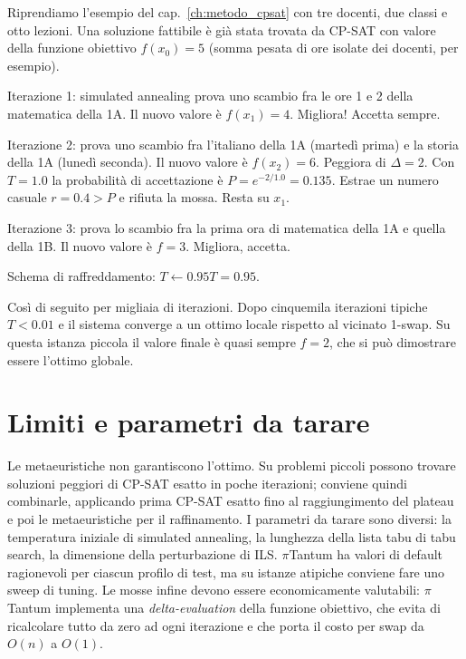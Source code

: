 \begin{esempiobox}
Riprendiamo l'esempio del cap.~\ref{ch:metodo_cpsat} con
tre docenti, due classi e otto lezioni. Una soluzione
fattibile \`e gi\`a stata trovata da CP-SAT con valore della
funzione obiettivo $f(x_0) = 5$ (somma pesata di ore isolate
dei docenti, per esempio).

Iterazione 1: simulated annealing prova uno scambio fra le
ore 1 e 2 della matematica della 1A. Il nuovo valore \`e
$f(x_1) = 4$. Migliora! Accetta sempre.

Iterazione 2: prova uno scambio fra l'italiano della 1A
(marted\`i prima) e la storia della 1A (luned\`i seconda).
Il nuovo valore \`e $f(x_2) = 6$. Peggiora di $\Delta = 2$.
Con $T = 1.0$ la probabilit\`a di accettazione \`e $P =
e^{-2/1.0} = 0.135$. Estrae un numero casuale $r = 0.4 > P$
e rifiuta la mossa. Resta su $x_1$.

Iterazione 3: prova lo scambio fra la prima ora di
matematica della 1A e quella della 1B. Il nuovo valore \`e
$f = 3$. Migliora, accetta.

Schema di raffreddamento: $T \leftarrow 0.95 T = 0.95$.

Cos\`i di seguito per migliaia di iterazioni. Dopo
cinquemila iterazioni tipiche $T < 0.01$ e il sistema
converge a un ottimo locale rispetto al vicinato 1-swap. Su
questa istanza piccola il valore finale \`e quasi sempre
$f = 2$, che si pu\`o dimostrare essere l'ottimo globale.
\end{esempiobox}

\section{Limiti e parametri da tarare}

\begin{avvertenzabox}
Le metaeuristiche non garantiscono l'ottimo. Su problemi
piccoli possono trovare soluzioni peggiori di CP-SAT esatto
in poche iterazioni; conviene quindi combinarle, applicando
prima CP-SAT esatto fino al raggiungimento del plateau e poi
le metaeuristiche per il raffinamento. I parametri da
tarare sono diversi: la temperatura iniziale di simulated
annealing, la lunghezza della lista tabu di tabu search, la
dimensione della perturbazione di ILS. $\pi$Tantum ha valori
di default ragionevoli per ciascun profilo di test, ma su
istanze atipiche conviene fare uno sweep di tuning. Le mosse
infine devono essere economicamente valutabili: $\pi$Tantum
implementa una \emph{delta-evaluation} della funzione
obiettivo, che evita di ricalcolare tutto da zero ad ogni
iterazione e che porta il costo per swap da $O(n)$ a $O(1)$.
\end{avvertenzabox}

